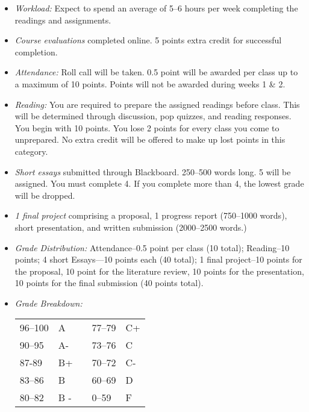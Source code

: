 \documentclass[article,oneside]{memoir}
\begin{document}
\begin{itemize}
\item \textit{Workload:} Expect to spend an average of 5--6 hours per week  completing the readings and assignments.

\item \textit{Course evaluations} completed online. 5 points extra credit for successful completion.

\item \textit{Attendance:} Roll call will be taken. 0.5 point will be awarded per class up to a maximum of 10 points. Points will not be awarded during weeks 1 \& 2. 

\item \textit{Reading:} You are required to prepare the assigned readings before class. This will be determined through discussion, pop quizzes, and reading responses. You begin with 10 points. You lose 2 points for every class you come to unprepared. No extra credit will be offered to make up lost points in this category. 

\item \textit{Short essays} submitted through Blackboard. 250--500 words long. 5 will be assigned. You must complete 4. If you complete more than 4, the lowest grade will be dropped.
 
\item \textit{1 final project} comprising a proposal, 1 progress report (750--1000 words), short presentation, and written submission (2000--2500 words.)



\item \textit{Grade Distribution:} Attendance--0.5 point per class (10 total); Reading--10 points; 4 short Essays---10 points each (40 total); 1 final project--10 points for the proposal, 10 point for the literature review, 10 points for the presentation, 10 points for the final submission (40 points total).

\item \textit{Grade Breakdown:}

 \begin{tabular}{ | l | l | p{2cm} | l | l | }
    \hline 
96--100 & A  & &  77--79 &  C+ \\  
90--95 & A- & &  73--76 & C \\
87-89 & B+ &  &  70--72 & C- \\ 
83--86 & B  & &  60--69 & D\\
80--82 & B - & & 0--59 & F\\ \hline
    \end{tabular}


\end{itemize}
\end{document}
